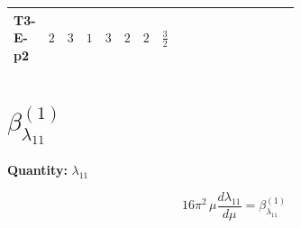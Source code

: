 \documentclass[8pt]{article}
\begin{document}
\begin{landscape}
\begin{longtable}{@{}llcccccc >{\raggedright\arraybackslash}p{0.21\linewidth} >{\raggedright\arraybackslash}p{0.21\linewidth} >{\raggedright\arraybackslash}p{0.21\linewidth}@{}}
T3-E-p2 & $2$ & $3$ & $1$ & $3$ & $2$ & $2$ & $\frac{3}{2}$ & \scriptsize\adjustbox{max width=\linewidth}{$\begin{gathered} +{\lambda_{12}^{(1)}} {\lambda_{12}^{(\times)}}\end{gathered}$} & \scriptsize\adjustbox{max width=\linewidth}{$\begin{gathered} +12 {\lambda_{12}^{(A)}}^2\end{gathered}$} & \scriptsize\adjustbox{max width=\linewidth}{$\begin{gathered} -\frac{{\lambda_{12}^{(\times)}}^2}{2}\end{gathered}$} \\
\midrule
\bottomrule
\end{longtable}
\clearpage
\section*{$\beta_{\lambda_{11}}^{(1)}$}
\noindent\textbf{Quantity: }$\lambda_{11}$\par\smallskip
\[16\pi^2\,\mu\frac{d \lambda_{11}}{d\mu}=\beta_{\lambda_{11}}^{(1)}\]

\end{landscape}
\end{document}
